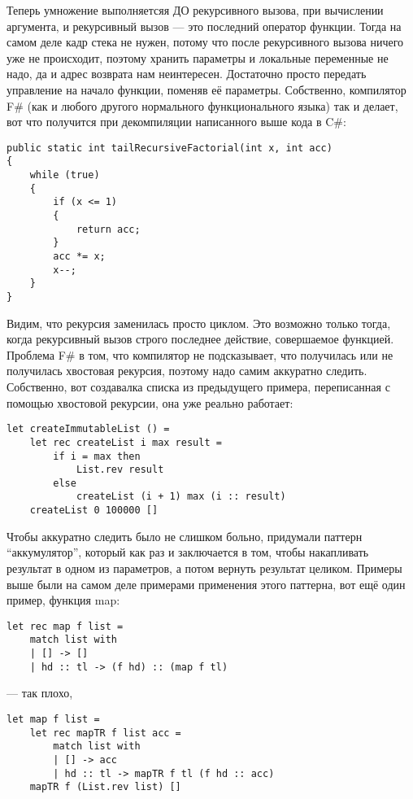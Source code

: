 \documentclass[a5paper]{article}
\begin{document}
Теперь умножение выполняетсяя ДО рекурсивного вызова, при вычислении аргумента, и рекурсивный вызов --- это последний оператор функции. Тогда на самом деле кадр стека не нужен, потому что после рекурсивного вызова ничего уже не происходит, поэтому хранить параметры и локальные переменные не надо, да и адрес возврата нам неинтересен. Достаточно просто передать управление на начало функции, поменяв её параметры. Собственно, компилятор F\# (как и любого другого нормального функционального языка) так и делает, вот что получится при декомпиляции написанного выше кода в C\#:

\begin{verbatim}
public static int tailRecursiveFactorial(int x, int acc)
{
    while (true)
    {
        if (x <= 1)
        {
            return acc;
        }
        acc *= x;
        x--;
    }
}
\end{verbatim}

Видим, что рекурсия заменилась просто циклом. Это возможно только тогда, когда рекурсивный вызов строго последнее действие, совершаемое функцией. Проблема F\# в том, что компилятор не подсказывает, что получилась или не получилась хвостовая рекурсия, поэтому надо самим аккуратно следить. Собственно, вот создавалка списка из предыдущего примера, переписанная с помощью хвостовой рекурсии, она уже реально работает:

\begin{verbatim}
let createImmutableList () =
    let rec createList i max result =
        if i = max then
            List.rev result
        else
            createList (i + 1) max (i :: result)
    createList 0 100000 []
\end{verbatim}


Чтобы аккуратно следить было не слишком больно, придумали паттерн ``аккумулятор'', который как раз и заключается в том, чтобы накапливать результат в одном из параметров, а потом вернуть результат целиком. Примеры выше были на самом деле примерами применения этого паттерна, вот ещё один пример, функция map:

\begin{verbatim}
let rec map f list =
    match list with
    | [] -> []
    | hd :: tl -> (f hd) :: (map f tl)
\end{verbatim}

--- так плохо, 

\begin{verbatim}
let map f list =
    let rec mapTR f list acc =
        match list with
        | [] -> acc
        | hd :: tl -> mapTR f tl (f hd :: acc)
    mapTR f (List.rev list) []
\end{verbatim}
\end{document}
